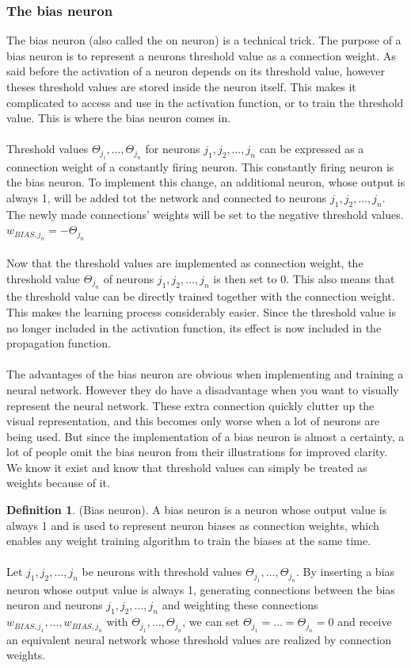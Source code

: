 \documentclass[pdftex,a4paper,12pt,twoside]{report}
\theoremstyle{plain} \newtheorem{theorem}{Theorem} \newtheorem{proposition}{Proposition} \newtheorem{lemma}{Lemma} \newtheorem*{corollary}{Corollary}
\theoremstyle{definition} \newtheorem{definition}{Definition} \newtheorem{conjecture}{Conjecture} \newtheorem*{example}{Example} \newtheorem{algorithm}{Algorithm}
\theoremstyle{remark} \newtheorem*{remark}{Remark} \newtheorem*{note}{Note} \newtheorem{case}{Case}
\begin{document}
\subsubsection{The bias neuron}
\label{subsubsec:biasneuron}
The bias neuron (also called the on neuron) is a technical trick. The purpose of a bias neuron is to represent a neurons threshold value as a connection weight. As said before the activation of a neuron depends on its threshold value, however theses threshold values are stored inside the neuron itself. This makes it complicated to access and use in the activation function, or to train the threshold value. This is where the bias neuron comes in.\\\\Threshold values $\Theta_{j_{i}}, \dotsc ,\Theta_{j_{n}}$ for neurons $j_1,j_2, \dotsc ,j_n$ can be expressed as a connection weight of a constantly firing neuron. This constantly firing neuron is the bias neuron. To implement this change, an additional neuron, whose output is always 1, will be added tot the network and connected to neurons $j_1,j_2, \dotsc ,j_n$. The newly made connections' weights will be set to the negative threshold values. $w_{BIAS,j_{n}} = - \Theta_{j_{n}}$\\\\Now that the threshold values are implemented as connection weight, the threshold value $\Theta_{j_{n}}$ of neurons $j_1,j_2, \dotsc ,j_n$ is then set to 0. This also means that the threshold value can be directly trained together with the connection weight. This makes the learning process considerably easier. Since the threshold value is no longer included in the activation function, its effect is now included in the propagation function.\\\\The advantages of the bias neuron are obvious when implementing and training a neural network. However they do have a disadvantage when you want to visually represent the neural network. These extra connection quickly clutter up the visual representation, and this becomes only worse when a lot of neurons are being used. But since the implementation of a bias neuron is almost a certainty, a lot of people omit the bias neuron from their illustrations for improved clarity. We know it exist and know that threshold values can simply be treated as weights because of it.
\begin{definition}
(Bias neuron). A bias neuron is a neuron whose output value is always 1 and is used to represent neuron biases as connection weights, which enables any weight training algorithm to train the biases at the same time.\\\\Let $j_1,j_2, \dotsc ,j_n$ be neurons with threshold values $\Theta_{j_{1}}, \dotsc ,\Theta_{j_{n}}$. By inserting a bias neuron whose output value is always 1, generating connections between the bias neuron and neurons $j_1,j_2, \dotsc ,j_n$ and weighting these connections $w_{BIAS,j_{1}},\dotsc,w_{BIAS,j_{n}}$ with $\Theta_{j_{1}}, \dotsc ,\Theta_{j_{n}}$, we can set $\Theta_{j_{1}}= \ldots = \Theta_{j_{n}} = 0$ and receive an equivalent neural network whose threshold values are realized by connection weights.
\end{definition}
\end{document}
